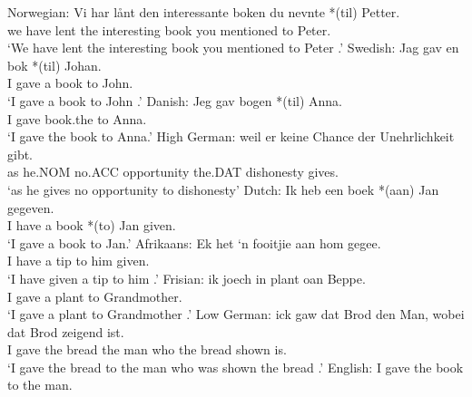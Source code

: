 \begin{exe}
	\ex \label{ex:preprec}
	\begin{xlist}
		\ex Norwegian:\label{ex:nor-tr}
		\gll Vi har lånt den interessante boken du nevnte *(til) Petter.\\
		we have lent the interesting book you mentioned to Peter.\\
		\trans `We have lent the interesting book you mentioned to Peter \citep{Larson.1988}.'
		\ex Swedish:\label{ex:sw-tr}
		\gll Jag gav en bok *(til) Johan.\\
		I gave a book to John.\\
		\trans `I gave a book to John \citep{Holmberg.1995}.'
		\ex Danish:\label{ex:dan-tr}
		\gll Jeg gav bogen *(til) Anna.\\
		I gave book.the to Anna.\\
		\trans `I gave the book to Anna\citep{Holmberg.1998}.'
		\ex High German:\label{ex:hg-tr}
		\gll weil er keine Chance der Unehrlichkeit gibt.\\
		as he.NOM no.ACC opportunity the.DAT dishonesty gives.\\
		\trans `as he gives no opportunity to dishonesty'
		\ex Dutch:\label{ex:dut-tr}
		\gll Ik heb een boek *(aan) Jan gegeven.\\
		I have a book *(to) Jan given.\\
		\trans `I gave a book to Jan.'
		\ex Afrikaans:\label{ex:af-tr}
		\gll Ek het `n fooitjie aan hom gegee.\\
		I have a tip to him given.\\
		\trans `I have given a tip to him \citep{Stadler.1996}.'
		\ex Frisian:\label{ex:fri-tr}
		\gll ik joech in plant oan Beppe.\\
		I gave a plant to Grandmother.\\
		\trans `I gave a plant to Grandmother \citep{Tiersma.1985}.'
		\ex Low German:\label{ex:lg-tr}
		\gll ick gaw dat Brod den Man, wobei dat Brod zeigend ist.\\
		I gave the bread the man who the bread shown is.\\
		\trans `I gave the bread to the man who was shown the bread \citep{Mussaus.1829}.'
		\ex English: I gave the book to the man.\label{ex:en-tr}
	\end{xlist}
\end{exe}

